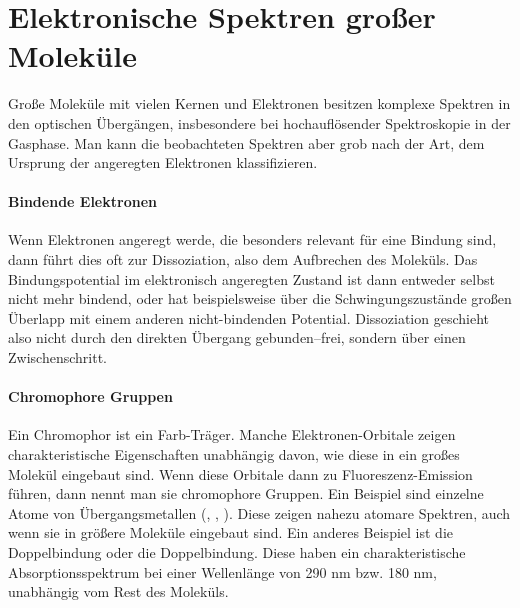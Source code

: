 
\section{Elektronische Spektren großer Moleküle}

Große Moleküle mit vielen Kernen und Elektronen besitzen komplexe Spektren in den optischen Übergängen, insbesondere bei hochauflösender Spektroskopie in der Gasphase. Man kann die beobachteten Spektren aber grob nach der Art, dem Ursprung der angeregten Elektronen klassifizieren.

\paragraph{Bindende Elektronen} Wenn Elektronen angeregt werde, die besonders relevant für eine Bindung sind, dann führt dies oft zur Dissoziation, also dem Aufbrechen des Moleküls. Das Bindungspotential im elektronisch angeregten Zustand ist dann entweder selbst nicht mehr bindend, oder hat beispielsweise über die Schwingungszustände großen Überlapp mit einem anderen nicht-bindenden Potential. Dissoziation geschieht also nicht durch den direkten Übergang gebunden--frei, sondern über einen Zwischenschritt.

\paragraph{Chromophore Gruppen} Ein Chromophor ist ein Farb-Träger. Manche Elektronen-Orbitale zeigen charakteristische Eigenschaften unabhängig davon, wie diese in ein großes Molekül eingebaut sind. Wenn diese Orbitale dann zu Fluoreszenz-Emission führen, dann nennt man sie chromophore Gruppen. Ein Beispiel sind einzelne Atome von Übergangsmetallen (, , ). Diese zeigen nahezu atomare Spektren, auch wenn sie in größere Moleküle eingebaut sind. Ein anderes Beispiel ist die  Doppelbindung oder die  Doppelbindung. Diese haben ein charakteristische Absorptionsspektrum bei einer Wellenlänge von 290 nm bzw. 180 nm, unabhängig vom Rest des Moleküls.

